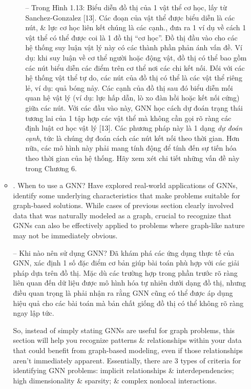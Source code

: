 \documentclass{article}
\begin{document}
\begin{itemize}
\begin{itemize}
\begin{itemize}
            -- Trong {\sf Hình 1.13: Biểu diễn đồ thị của 1 vật thể cơ học, lấy từ Sanchez-Gonzalez [13]. Các đoạn của vật thể được biểu diễn là các nút, \& lực cơ học liên kết chúng là các cạnh.}, đưa ra 1 ví dụ về cách 1 vật thể có thể được coi là 1 đồ thị ``cơ học''. Đồ thị đầu vào cho các hệ thống suy luận vật lý này có các thành phần phản ánh vấn đề. Ví dụ: khi suy luận về cơ thể người hoặc động vật, đồ thị có thể bao gồm các nút biểu diễn các điểm trên cơ thể nơi các chi kết nối. Đối với các hệ thống vật thể tự do, các nút của đồ thị có thể là các vật thể riêng lẻ, ví dụ: quả bóng nảy. Các cạnh của đồ thị sau đó biểu diễn mối quan hệ vật lý (ví dụ: lực hấp dẫn, lò xo đàn hồi hoặc kết nối cứng) giữa các nút. Với các đầu vào này, GNN học cách dự đoán trạng thái tương lai của 1 tập hợp các vật thể mà không cần gọi rõ ràng các định luật cơ học vật lý [13]. Các phương pháp này là 1 dạng {\it dự đoán cạnh}, tức là chúng dự đoán cách các nút kết nối theo thời gian. Hơn nữa, các mô hình này phải mang tính động để tính đến sự tiến hóa theo thời gian của hệ thống. Hãy xem xét chi tiết những vấn đề này trong Chương 6.
        \end{itemize}
        \item {. When to use a GNN?} Have explored real-world applications of GNNs, identify some underlying characteristics that make problems suitable for graph-based solutions. While cases of previous section clearly involved data that was naturally modeled as a graph, crucial to recognize that GNNs can also be effectively applied to problems where graph-like nature may not be immediately obvious.

        -- {\sf Khi nào nên sử dụng GNN?} Đã khám phá các ứng dụng thực tế của GNN, xác định 1 số đặc điểm cơ bản giúp bài toán phù hợp với các giải pháp dựa trên đồ thị. Mặc dù các trường hợp trong phần trước rõ ràng liên quan đến dữ liệu được mô hình hóa tự nhiên dưới dạng đồ thị, nhưng điều quan trọng là phải nhận ra rằng GNN cũng có thể được áp dụng hiệu quả cho các bài toán mà bản chất giống đồ thị có thể không rõ ràng ngay lập tức.

        So, instead of simply stating GNNs are useful for graph problems, this section will help you recognize patterns \& relationships within your data that could benefit from graph-based modeling, even if those relationships aren't immediately apparent. Essentially, there are 3 types of criteria for identifying GNN problems: implicit relationships \& interdependencies; high dimensionality \& sparsity; \& complex nonlocal interactions.


\end{itemize}
\end{itemize}
\end{document}
